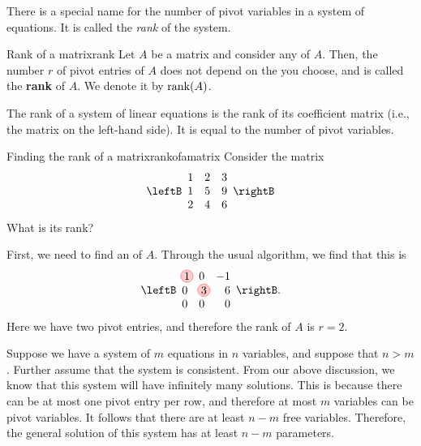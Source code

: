 There is a special name for the number of pivot variables in a system
of equations. It is called the {\em rank} of the system.

\begin{definition}{Rank of a matrix}{rank}
  Let $A$ be a matrix and consider any {\ef} of $A$.  Then, the number
  $r$ of pivot entries of $A$ does not depend on the {\ef} you choose,
  and is called the \textbf{rank} of $A$. We denote
  it by $\mbox{rank}(A)$.

  The rank of a system of linear equations is the rank of its
  coefficient matrix (i.e., the matrix on the left-hand side).
  It is equal to the number of pivot variables.
\end{definition}

\begin{example}{Finding the rank of a matrix}{rankofamatrix}
Consider the matrix
\begin{equation*}
\leftB
\begin{array}{rrr}
1 & 2 & 3 \\
1 & 5 & 9 \\
2 & 4 & 6 
\end{array}
\rightB
\end{equation*}
What is its rank?
\end{example}

\begin{solution}
  First, we need to find an {\ef} of $A$. Through the usual algorithm,
  we find that this is
  \begin{equation*}
    \leftB
    \begin{array}{rrr}
      \circled{1} & 0 & -1 \\
      0 & \circled{3} & 6 \\
      0 & 0 & 0
    \end{array}
    \rightB.
  \end{equation*}
  Here we have two pivot entries, and therefore the rank of $A$ is
  $r=2$.
\end{solution}

Suppose we have a system of $m$ equations in $n$ variables, and
suppose that $n>m$. Further assume that the system is consistent. From
our above discussion, we know that this system will have infinitely
many solutions. This is because there can be at most one pivot entry
per row, and therefore at most $m$ variables can be pivot
variables. It follows that there are at least $n-m$ free variables.
Therefore, the general solution of this system has at least $n-m$
parameters.

